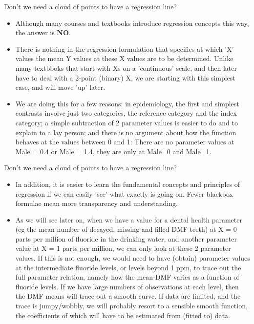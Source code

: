 \documentclass[10pt]{beamer}\usepackage[]{graphicx}\usepackage[]{color}
\begin{document}
\begin{frame}{Don't we need a cloud of points to have a regression line?}
	\pause 
	\begin{itemize}
		\item Although many courses and textbooks introduce regression concepts this way, the answer is \textbf{NO}. \pause 
		
		\item There is nothing in the regression formulation that specifies at which 'X' values the mean Y values at these X values are to be determined. Unlike many textbboks that start with Xs on a 'continuous' scale, and then later have to deal with a 2-point (binary) X, we are starting with this simplest case, and will move 'up' later. \pause 
		
		\item We are doing this for a few reasons: in epidemiology, the first and simplest contrasts involve just two categories, the reference category and the index category; a simple subtraction of 2 parameter values is easier to do and to explain to a lay person; and there is no argument about how the function behaves at the values between 0 and 1:  There are no parameter values at Male = 0.4 or Male = 1.4, they are only at Male=0 and Male=1. 
 
	\end{itemize}
\end{frame}

\begin{frame}{Don't we need a cloud of points to have a regression line?}
	
		\begin{itemize}
			
		\item In addition, it is easier to learn the fundamental concepts and principles of regression if we can easily 'see' what exactly is going on. Fewer blackbox formulae mean more transparency and understanding. \pause 
		
		\item As we will see later on, when we have a value for a dental health parameter (eg the mean number of decayed, missing and filled DMF teeth) at X = 0 parts per million of fluoride in the drinking water, and another parameter value at X = 1 parts per million, we can only look at these 2 parameter values. If this is not enough, we would need to have (obtain) parameter values at the intermediate fluoride levels, or levels beyond 1 ppm, to trace out the full parameter relation, namely  how the mean-DMF varies as a function of fluoride levels. If we have large numbers of observations at each level, then the DMF means will trace out a smooth curve. If data are limited, and the trace is jumpy/wobbly, we will probably resort to a sensible smooth function, the coefficients of which will have to be estimated from (fitted to) data. 
	\end{itemize}
\end{frame}
\end{document}
